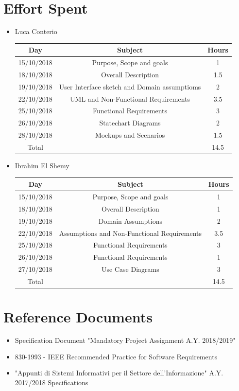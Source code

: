 \documentclass[12pt,a4paper]{article}
\begin{document}
	\section{Effort Spent}
	\begin{itemize}
		\item Luca Conterio
		\begin{center}
			\begin{tabular}{| c | c | c |}
				\hline
				Day & Subject & Hours \\ \hline
				15/10/2018 & Purpose, Scope and goals & 1 \\
				18/10/2018 & Overall Description & 1.5 \\
				19/10/2018  & User Interface sketch and Domain assumptioms & 2 \\
				22/10/2018  & UML and Non-Functional Requirements & 3.5 \\
				25/10/2018 & Functional Requirements & 3 \\
				26/10/2018 & Statechart Diagrams & 2 \\
				28/10/2018 & Mockups and Scenarios & 1.5 \\
				\hline
				Total & & 14.5 \\
				\hline
			\end{tabular}
		\end{center}
		
		\item Ibrahim El Shemy
		\begin{center}
			\begin{tabular}{| c | c | c |}
				\hline
				Day & Subject & Hours \\ \hline
				15/10/2018 & Purpose, Scope and goals & 1 \\
				18/10/2018 & Overall Description & 1 \\
				19/10/2018  & Domain Assumptions & 2 \\
				22/10/2018  & Assumptions and Non-Functional Requirements & 3.5 \\
				25/10/2018 & Functional Requirements & 3 \\
				26/10/2018 & Functional Requirements & 1 \\
				27/10/2018 & Use Case Diagrams & 3 \\
				\hline
				Total & & 14.5 \\
				\hline
			\end{tabular}
		\end{center}
	\end{itemize}
	\section{Reference Documents}
	\begin{itemize}
		\item Specification Document "Mandatory Project Assignment A.Y. 2018/2019"
		\item 830-1993 - IEEE Recommended Practice for Software Requirements
		\item "Appunti di Sistemi Informativi per il Settore dell'Informazione" A.Y. 2017/2018
		Specifications
	\end{itemize}
\end{document}
